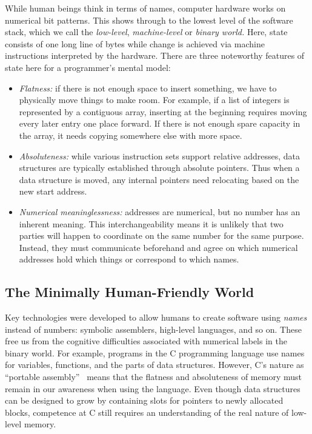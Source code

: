 \documentclass[ twoside,openright,titlepage,numbers=noenddot,headinclude,footinclude,cleardoublepage=empty,abstract=on,
                BCOR=5mm,paper=a4,fontsize=11pt
                ]{scrreprt}
\newcommand{\joel}[1]{}
\providecommand{\tightlist}{}\newenvironment{longtable}[2]{\begin{tabular}}{\end{tabular}}
\theoremstyle{definition}
\begin{document}
While human beings think in terms of names, computer hardware works on
numerical bit patterns. This shows through to the lowest level of the
software stack, which we call the \emph{low-level}, \emph{machine-level}
or \emph{binary world.} Here, state consists of one long line of bytes
while change is achieved via machine instructions interpreted by the
hardware. There are three noteworthy features of state here for a
programmer's mental model:

\begin{itemize}
\tightlist
\item
  \emph{Flatness:} if there is not enough space to insert something, we
  have to physically move things to make room. For example, if a list of
  integers is represented by a contiguous array, inserting at the
  beginning requires moving every later entry one place forward. If
  there is not enough spare capacity in the array, it needs copying
  somewhere else with more space.
\item
  \emph{Absoluteness:} while various instruction sets support relative
  addresses, data structures are typically established through absolute
  pointers. Thus when a data structure is moved, any internal pointers
  need relocating based on the new start address.
\item
  \emph{Numerical meaninglessness:} addresses are numerical, but no
  number has an inherent meaning. This interchangeability means it is
  unlikely that two parties will happen to coordinate on the same number
  for the same purpose. Instead, they must communicate beforehand and
  agree on which numerical addresses hold which things or correspond to
  which names.
\end{itemize}

\hypertarget{the-minimally-human-friendly-world}{\subsection{The Minimally Human-Friendly
World}\label{the-minimally-human-friendly-world}}

\joel{https://gutenberg.org/files/12/12-h/12-h.htm What's the use of having names?}

Key technologies were developed to allow humans to create software using
\emph{names} instead of numbers: symbolic assemblers, high-level
languages, and so on. These free us from the cognitive difficulties
associated with numerical labels in the binary world. For example,
programs in the C programming language use names for variables,
functions, and the parts of data structures. However, C's nature as
``portable assembly''~\parencite{Cprog} means that the flatness and
absoluteness of memory must remain in our awareness when using the
language. Even though data structures can be designed to grow by
containing slots for pointers to newly allocated blocks, competence at C
still requires an understanding of the real nature of low-level memory.
\end{document}
